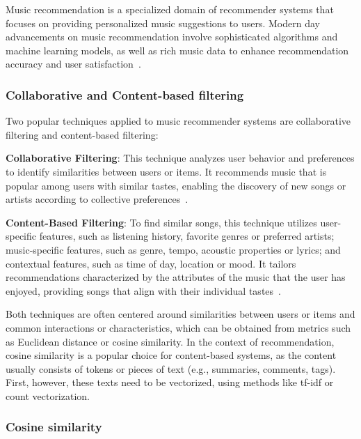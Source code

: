 Music recommendation is a specialized domain of recommender systems that focuses on providing personalized music suggestions to users. Modern day advancements on music recommendation involve sophisticated algorithms and machine learning models, as well as rich music data to enhance recommendation accuracy and user satisfaction~\cite{CHAPTER:RS-HANDBOOK-MUSIC}.

\subsubsection{Collaborative and Content-based filtering}

Two popular techniques applied to music recommender systems are collaborative filtering and content-based filtering:

\begin{compactitem}[\textbullet]
\item \textbf{Collaborative Filtering}: This technique analyzes user behavior and preferences to identify similarities between users or items. It recommends music that is popular among users with similar tastes, enabling the discovery of new songs or artists according to collective preferences~\cite[Chapter 3.1]{CHAPTER:RS-HANDBOOK-MUSIC}.

\item \textbf{Content-Based Filtering}: To find similar songs, this technique utilizes user-specific features, such as listening history, favorite genres or preferred artists; music-specific features, such as genre, tempo, acoustic properties or lyrics; and contextual features, such as time of day, location or mood. It tailors recommendations characterized by the attributes of the music that the user has enjoyed, providing songs that align with their individual tastes~\cite[Chapter 3.2]{CHAPTER:RS-HANDBOOK-MUSIC}.

\end{compactitem}

Both techniques are often centered around similarities between users or items and common interactions or characteristics, which can be obtained from metrics such as Euclidean distance or cosine similarity. In the context of recommendation, cosine similarity is a popular choice for content-based systems, as the content usually consists of tokens or pieces of text (e.g., summaries, comments, tags). First, however, these texts need to be vectorized, using methods like \acs{tf}-\acs{idf} or count vectorization.

\subsubsection{Cosine similarity}

